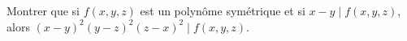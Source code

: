 Montrer que si $f(x, y, z)$ est un polynôme symétrique et si $x - y \mid f(x, y, z)$, alors $(x - y)^2(y - z)^2(z - x)^2 \mid f(x, y, z)$.
